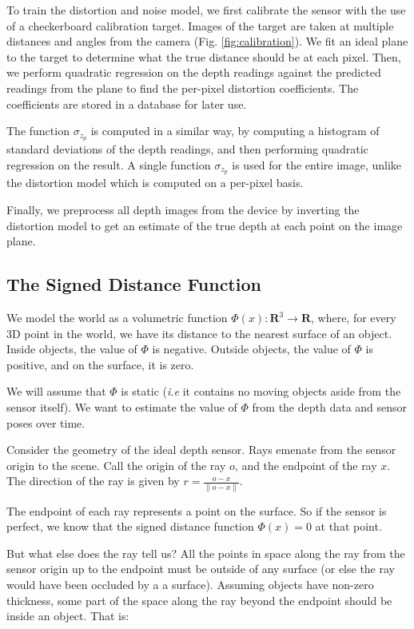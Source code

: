 \documentclass[conference,10pt]{IEEEtran}
\begin{document}
 To train the distortion and noise model, we first calibrate the sensor with the
 use of a checkerboard calibration target. Images of the target are taken at
 multiple distances and angles from the camera (Fig. \ref{fig:calibration}). We
 fit an ideal plane to the target to determine what the true distance should be
 at each pixel. Then, we perform quadratic regression on the depth readings
 against the predicted readings from the plane to find the per-pixel distortion
 coefficients. The coefficients are stored in a database for later use.

The function $\sigma_{z_p}$ is computed in a similar way, by computing a
histogram of standard deviations of the depth readings, and then performing
quadratic regression on the result. A single function $\sigma_{z_p}$ is used for
the entire image, unlike the distortion model which is computed on a per-pixel
basis.

Finally, we preprocess all depth images from the device by inverting the
distortion model to get an estimate of the true depth at each point on the
image plane.

\subsection{The Signed Distance Function}
We model the world as a volumetric function $\Phi(x) : \mathbf{R}^3 \to
\mathbf{R}$, where, for every 3D point in the world, we have its distance to the
nearest surface of an object. Inside objects, the value of $\Phi$ is negative.
Outside objects, the value of $\Phi$ is positive, and on the surface, it is
zero.

 We will assume that $\Phi$ is static (\textit{i.e} it contains no moving
 objects aside from the sensor itself). We want to estimate the value of $\Phi$
 from the depth data and sensor poses over time.

Consider the geometry of the ideal depth sensor. Rays emenate from the sensor
origin to the scene. Call the origin of the ray $o$, and the endpoint of the ray
$x$. The direction of the ray is given by $r = \frac{o - x}{\|o - x\|}$.

The endpoint of each ray represents a point on the surface. So if the sensor is
perfect, we know that the signed distance function $\Phi(x) = 0$ at that point. 

But what else does the ray tell us? All the points in space along the ray from
the sensor origin up to the endpoint must be outside of any surface (or else the
ray would have been occluded by a a surface). Assuming objects have non-zero
thickness, some part of the space along the ray beyond the endpoint should be
inside an object. That is:
\end{document}
